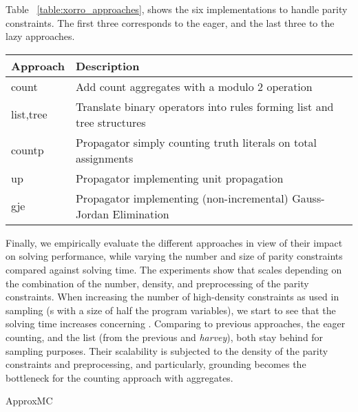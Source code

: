 \documentclass[letterpaper]{article} %
\begin{document}
 Table~ \ref{table:xorro_approaches}, shows the six implementations to handle parity constraints.
 The first three corresponds to the eager, and the last three to the lazy approaches. 
 
 \begin{table*}[t]
\caption{\xorro{} approaches to handle parity constraints}\label{table:xorro_approaches}
 	\begin{tabular}{ l|l }
 		Approach  & Description  \\
 		\hline\hline
 		count     & Add count aggregates with a modulo 2 operation  \\  
 		list,tree & Translate binary \XOR{} operators into rules forming list and tree structures \\
 		countp    & Propagator simply counting truth literals on total assignments\\
 		up        & Propagator implementing unit propagation\\
 		gje       & Propagator implementing (non-incremental) Gauss-Jordan Elimination
 		
 	\end{tabular}
\end{table*}
 Finally, we empirically evaluate the different approaches in view of their impact on solving performance,
 while varying the number and size of parity constraints compared against \clingo{} solving time.
 The experiments show that \xorro{} scales depending on the combination of the number, density, and preprocessing of the parity constraints.
 When increasing the number of high-density constraints as used in sampling (\XOR{}s with a size of half the program variables), we start to see that the solving time increases concerning \clingo.
 Comparing to previous approaches, the eager counting, and the list (from the previous \xorro{} and \emph{harvey}), both stay behind for sampling purposes. Their scalability is subjected to the density of the parity constraints and preprocessing, and particularly, grounding becomes the bottleneck for the counting approach with aggregates.
 
 

ApproxMC~\cite{DBLP:conf/cp/ChakrabortyMV13}




\end{document}
